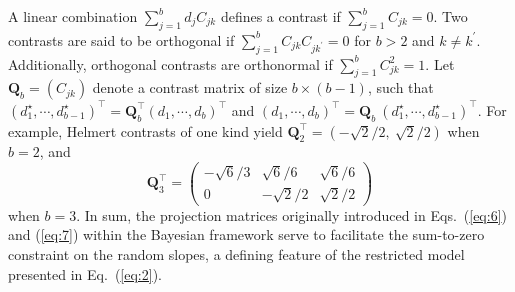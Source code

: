 \documentclass[preprint,12pt,authoryear]{elsarticle}
\begin{document}
A linear combination $\textstyle\sum_{j=1}^b d_j C_{jk}$ defines a contrast if $\textstyle\sum_{j=1}^b C_{jk}=0$. Two contrasts are said to be orthogonal if $\textstyle\sum_{j=1}^b C_{jk}C_{jk^\prime}=0$ for $b>2$ and $k\neq k^\prime$. Additionally, orthogonal contrasts are orthonormal if $\textstyle\sum_{j=1}^b C_{jk}^2=1$. Let $\mathbf{Q}_b=(C_{jk})$ denote a contrast matrix of size $b\times(b-1)$, such that $(d_1^\star,\dotsb,d_{b-1}^\star)^\top=\mathbf{Q}_b^\top(d_1,\dotsb,d_{b})^\top$ and $(d_1,\dotsb,d_{b})^\top=\mathbf{Q}_b\ (d_1^\star,\dotsb,d_{b-1}^\star)^\top$. For example, Helmert contrasts of one kind yield $\mathbf{Q}_2^\top=(-\sqrt{2}/2,\ \!\sqrt{2}/2)$ when $b=2$, and
\begin{equation*}
	\mathbf{Q}_3^\top=\begin{pmatrix} -\sqrt{6}/3 & \sqrt{6}/6 & \sqrt{6}/6 \\ 0 & -\sqrt{2}/2 & \sqrt{2}/2 \end{pmatrix}
\end{equation*}
when $b=3$. In sum, the projection matrices originally introduced in Eqs.~(\ref{eq:6}) and (\ref{eq:7}) within the Bayesian framework serve to facilitate the sum-to-zero constraint on the random slopes, a defining feature of the restricted model presented in Eq.~(\ref{eq:2}).
\end{document}

